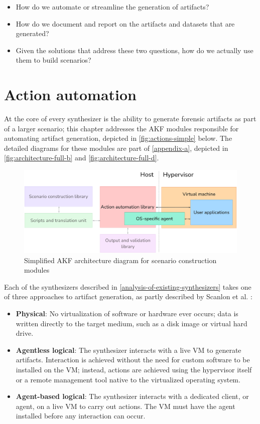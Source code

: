 \documentclass[letterpaper,12pt]{report}
\def\tightlist{}
\begin{document}
\begin{itemize}
\tightlist
\item
  How do we automate or streamline the generation of artifacts?
\item
  How do we document and report on the artifacts and datasets that are
  generated?
\item
  Given the solutions that address these two questions, how do we
  actually use them to build scenarios?
\end{itemize}

\chapter{Action automation}\label{chapter-four}

At the core of every synthesizer is the ability to generate forensic
artifacts as part of a larger scenario; this chapter addresses the AKF
modules responsible for automating artifact generation, depicted in
\autoref{fig:actions-simple} below. The detailed diagrams for these
modules are part of \autoref{appendix-a}, depicted in
\autoref{fig:architecture-full-b} and \autoref{fig:architecture-full-d}.

\begin{figure}[h]
\centering
\includegraphics[width=1\linewidth]{actions-simple.png}
\caption{Simplified AKF architecture diagram for scenario construction
modules}\label{fig:actions-simple}
\end{figure}

Each of the synthesizers described in \autoref{analysis-of-existing-synthesizers} takes one of three
approaches to artifact generation, as partly described by Scanlon et al.
\cite{scanlonEviPlantEfficientDigital2017}:

\begin{itemize}
\tightlist
\item
  \textbf{Physical}: No virtualization of software or hardware ever
  occurs; data is written directly to the target medium, such as a disk
  image or virtual hard drive.
\item
  \textbf{Agentless logical}: The synthesizer interacts with a live VM
  to generate artifacts. Interaction is achieved without the need for
  custom software to be installed on the VM; instead, actions are
  achieved using the hypervisor itself or a remote management tool
  native to the virtualized operating system.
\item
  \textbf{Agent-based logical}: The synthesizer interacts with a
  dedicated client, or agent, on a live VM to carry out actions. The VM
  must have the agent installed before any interaction can occur.
\end{itemize}
\end{document}
